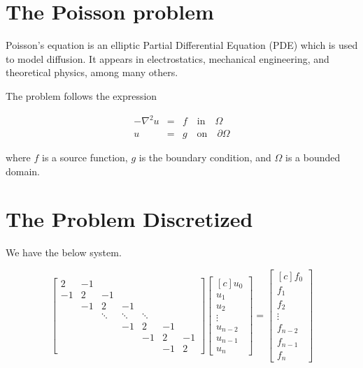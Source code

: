 \documentclass[fontsize=11pt,paper=a4,titlepage]{article}
\begin{document}
\section{The Poisson problem}
\label{sec:Pois-Prob}

Poisson's equation is an elliptic Partial Differential Equation (PDE) which is
used to model diffusion. It appears in electrostatics, mechanical
engineering, and theoretical physics, among many others.

The problem follows the expression

\begin{eqnarray}
	-\nabla^2 u & = & f \quad \textrm{in} \quad \Omega \\
	u & = & g \quad \textrm{on} \quad \partial\Omega
	\label{eq:Poisson}
\end{eqnarray}

where $f$ is a source function, $g$ is the boundary condition, and $\Omega$ is a
bounded domain.

\section{The Problem Discretized}
\label{sec:Prob-Discr}

We have the below system.

\begin{displaymath}
\begin{bmatrix}
	2 & -1 &  &  &  &  &  \\
	-1 & 2 & -1 &  &  &  &  \\
	 & -1 & 2 & -1 &  &  &  \\
	 &  & \ddots & \ddots & \ddots &  & \\
	 &  &  & -1 & 2 & -1 &  \\
	 &  &  &  & -1 & 2 & -1 \\
	 &  &  &  &  & -1 & 2
\end{bmatrix}
\begin{bmatrix*}[c]
	u_0 \\
	u_1 \\
	u_2 \\
	\vdots \\
	u_{n - 2} \\
	u_{n - 1} \\
	u_n
\end{bmatrix*}
=
\begin{bmatrix*}[c]
	f_0 \\
	f_1 \\
	f_2 \\
	\vdots \\
	f_{n - 2} \\
	f_{n - 1} \\
	f_n
\end{bmatrix*}
\end{displaymath}
\end{document}
